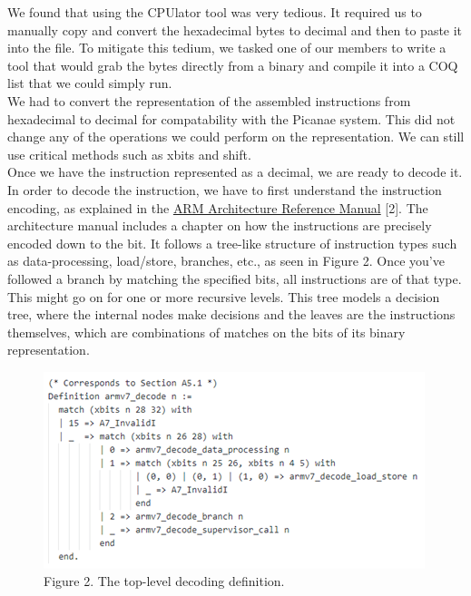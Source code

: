 \documentclass{article}
\begin{document}
\begin{multicols}{2}
We found that using the CPUlator tool was very tedious. It required us to manually copy and convert the hexadecimal bytes to decimal and then to paste it into the file. To mitigate this tedium, we tasked one of our members to write a tool that would grab the bytes directly from a binary and compile it into a COQ list that we could simply run.\\

We had to convert the representation of the assembled instructions from hexadecimal to decimal for compatability with the Picanae system. This did not change any of the operations we could perform on the representation. We can still use critical methods such as xbits and shift.\\

Once we have the instruction represented as a decimal, we are ready to decode it. In order to decode the instruction, we have to first understand the instruction encoding, as explained in the \href{https://developer.arm.com/documentation/ddi0406/c}{ARM Architecture Reference Manual} [2]. The architecture manual includes a chapter on how the instructions are precisely encoded down to the bit. It follows a tree-like structure of instruction types such as data-processing, load/store, branches, etc., as seen in Figure 2.  Once you’ve followed a branch by matching the specified bits, all instructions are of that type. This might go on for one or more recursive levels. This tree models a decision tree, where the internal nodes make decisions and the leaves are the instructions themselves, which are combinations of matches on the bits of its binary representation.\\

\begin{figure}[H]
\includegraphics[width=\linewidth]{top-level_decode.png}\\
Figure 2. The top-level decoding definition.
\centering
\end{figure}


\end{multicols}
\end{document}
